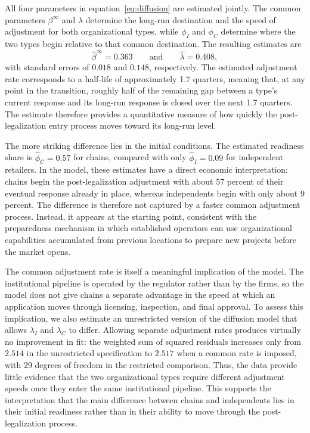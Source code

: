 \documentclass[english,12pt]{article}
\begin{document}
All four parameters in equation~\eqref{eq:diffusion} are estimated jointly. The common parameters $\beta^\infty$ and $\lambda$ determine the long-run destination and the speed of adjustment for both organizational types, while $\phi_I$ and $\phi_C$ determine where the two types begin relative to that common destination. The resulting estimates are
\[
\hat{\beta}^{\infty}=0.363
\qquad\text{and}\qquad
\hat{\lambda}=0.408,
\]
with standard errors of $0.018$ and $0.148$, respectively. The estimated adjustment rate corresponds to a half-life of approximately 1.7 quarters, meaning that, at any point in the transition, roughly half of the remaining gap between a type's current response and its long-run response is closed over the next 1.7 quarters. The estimate therefore provides a quantitative measure of how quickly the post-legalization entry process moves toward its long-run level.

The more striking difference lies in the initial conditions. The estimated readiness share is $\hat{\phi}_C=0.57$ for chains, compared with only $\hat{\phi}_I=0.09$ for independent retailers. In the model, these estimates have a direct economic interpretation: chains begin the post-legalization adjustment with about 57 percent of their eventual response already in place, whereas independents begin with only about 9 percent. The difference is therefore not captured by a faster common adjustment process. Instead, it appears at the starting point, consistent with the preparedness mechanism in which established operators can use organizational capabilities accumulated from previous locations to prepare new projects before the market opens.

The common adjustment rate is itself a meaningful implication of the model. The institutional pipeline is operated by the regulator rather than by the firms, so the model does not give chains a separate advantage in the speed at which an application moves through licensing, inspection, and final approval. To assess this implication, we also estimate an unrestricted version of the diffusion model that allows $\lambda_I$ and $\lambda_C$ to differ. Allowing separate adjustment rates produces virtually no improvement in fit: the weighted sum of squared residuals increases only from $2.514$ in the unrestricted specification to $2.517$ when a common rate is imposed, with 29 degrees of freedom in the restricted comparison. Thus, the data provide little evidence that the two organizational types require different adjustment speeds once they enter the same institutional pipeline. This supports the interpretation that the main difference between chains and independents lies in their initial readiness rather than in their ability to move through the post-legalization process.
\end{document}
